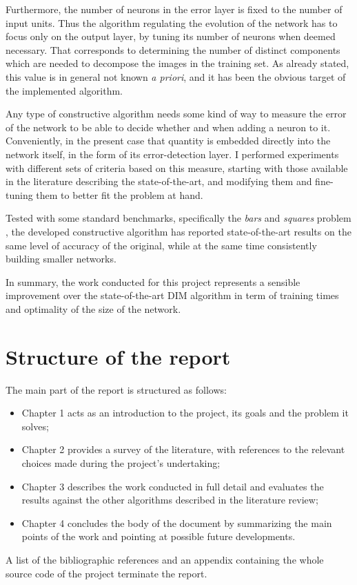 \documentclass[11pt,a4paper]{report}
\begin{document}
			Furthermore, the number of neurons in the error layer is fixed to the number of input units. Thus the algorithm regulating the evolution of the network has to focus only on the output layer, by tuning its number of neurons when deemed necessary. That corresponds to determining the number of distinct components which are needed to decompose the images in the training set. As already stated, this value is in general not known \emph{a priori}, and it has been the obvious target of the implemented algorithm.
		
			Any type of constructive algorithm needs some kind of way to measure the error of the network to be able to decide whether and when adding a neuron to it. Conveniently, in the present case that quantity is embedded directly into the network itself, in the form of its error-detection layer. I performed experiments with different sets of criteria based on this measure, starting with those available in the literature describing the state-of-the-art, and modifying them and fine-tuning them to better fit the problem at hand.
		
			Tested with some standard benchmarks, specifically the \emph{bars} \cite{spratling2012unsupervised} and \emph{squares} problem \cite{spratling2009unsupervised}, the developed constructive algorithm has reported state-of-the-art results on the same level of accuracy of the original, while at the same time consistently building smaller networks.
		
			In summary, the work conducted for this project represents a sensible improvement over the state-of-the-art DIM algorithm in term of training times and optimality of the size of the network.

		\section{Structure of the report}
			The main part of the report is structured as follows:
			\begin{itemize}
				\item Chapter 1 acts as an introduction to the project, its goals and the problem it solves;
				\item Chapter 2 provides a survey of the literature, with references to the relevant choices made during the project's undertaking;
				\item Chapter 3 describes the work conducted in full detail and evaluates the results against the other algorithms described in the literature review;
				\item Chapter 4 concludes the body of the document by summarizing the main points of the work and pointing at possible future developments.
			\end{itemize}
			A list of the bibliographic references and an appendix containing the whole source code of the project terminate the report.
	
\end{document}
